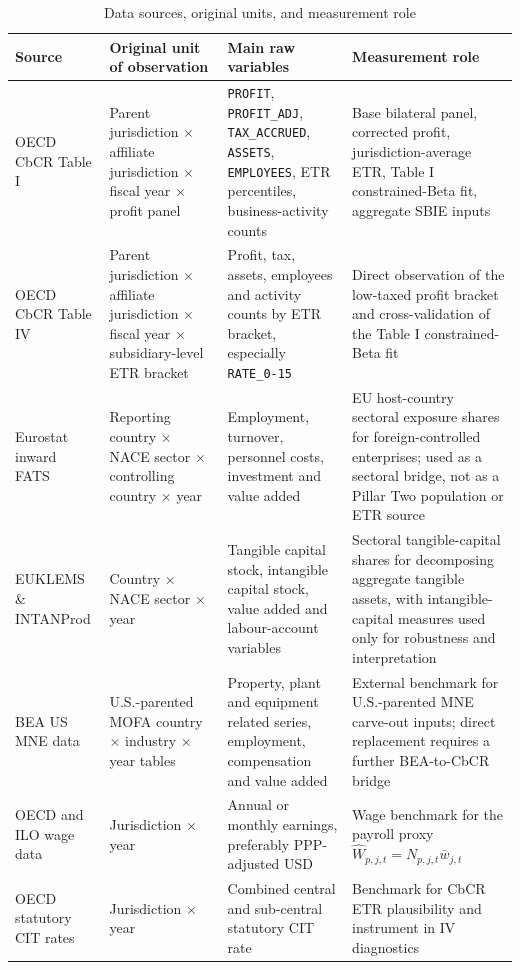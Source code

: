 \documentclass[11pt,a4paper]{article}
\newcommand{\code}[1]{\texttt{#1}}
\begin{document}
\begin{table}[H]
\centering
\caption{Data sources, original units, and measurement role}
\label{tab:data_sources_units}
\footnotesize
\begin{tabularx}{\textwidth}{@{}L{2.8cm}L{3.2cm}L{3.2cm}X@{}}
\toprule
Source & Original unit of observation & Main raw variables & Measurement role \\
\midrule
OECD CbCR Table I & Parent jurisdiction $\times$ affiliate jurisdiction $\times$ fiscal year $\times$ profit panel & \code{PROFIT}, \code{PROFIT\_ADJ}, \code{TAX\_ACCRUED}, \code{ASSETS}, \code{EMPLOYEES}, ETR percentiles, business-activity counts & Base bilateral panel, corrected profit, jurisdiction-average ETR, Table I constrained-Beta fit, aggregate SBIE inputs \\
OECD CbCR Table IV & Parent jurisdiction $\times$ affiliate jurisdiction $\times$ fiscal year $\times$ subsidiary-level ETR bracket & Profit, tax, assets, employees and activity counts by ETR bracket, especially \code{RATE\_0-15} & Direct observation of the low-taxed profit bracket and cross-validation of the Table I constrained-Beta fit \\
Eurostat inward FATS & Reporting country $\times$ NACE sector $\times$ controlling country $\times$ year & Employment, turnover, personnel costs, investment and value added & EU host-country sectoral exposure shares for foreign-controlled enterprises; used as a sectoral bridge, not as a Pillar Two population or ETR source \\
EUKLEMS \& INTANProd & Country $\times$ NACE sector $\times$ year & Tangible capital stock, intangible capital stock, value added and labour-account variables & Sectoral tangible-capital shares for decomposing aggregate tangible assets, with intangible-capital measures used only for robustness and interpretation \\
BEA US MNE data & U.S.-parented MOFA country $\times$ industry $\times$ year tables & Property, plant and equipment related series, employment, compensation and value added & External benchmark for U.S.-parented MNE carve-out inputs; direct replacement requires a further BEA-to-CbCR bridge \\
OECD and ILO wage data & Jurisdiction $\times$ year & Annual or monthly earnings, preferably PPP-adjusted USD & Wage benchmark for the payroll proxy $\hat{W}_{p,j,t}=N_{p,j,t}\bar{w}_{j,t}$ \\
OECD statutory CIT rates & Jurisdiction $\times$ year & Combined central and sub-central statutory CIT rate & Benchmark for CbCR ETR plausibility and instrument in IV diagnostics \\

\end{tabularx}
\end{table}
\end{document}
